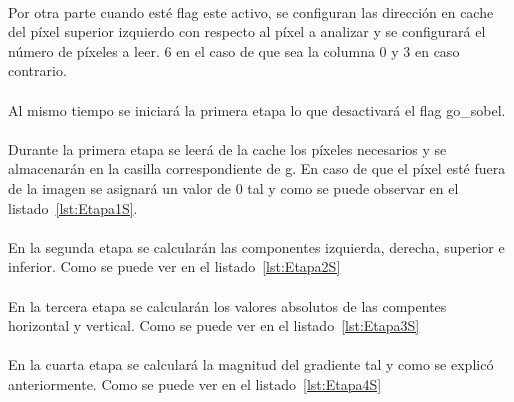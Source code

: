 \documentclass[a4paper,12pt,titlepage,final]{book}
\begin{document}
\paragraph{}
Por otra parte cuando esté flag este activo, se configuran las dirección en cache del píxel superior izquierdo con respecto al píxel a analizar y se configurará el número de píxeles a leer. 6 en el caso de que sea la columna 0 y 3 en caso contrario.

\paragraph{}
Al mismo tiempo se iniciará la primera etapa lo que desactivará el flag go\_sobel.

\paragraph{}
Durante la primera etapa se leerá de la cache los píxeles necesarios y se almacenarán en la casilla correspondiente de g. En caso de que el píxel esté fuera de la imagen se asignará un valor de 0 tal y como se puede observar en el listado~\ref{lst:Etapa1S}.



\paragraph{}
En la segunda etapa se calcularán las componentes izquierda, derecha, superior e inferior. Como se puede ver en el listado~\ref{lst:Etapa2S}



\paragraph{}
En la tercera etapa se calcularán los valores absolutos de las compentes horizontal y vertical. Como se puede ver en el listado~\ref{lst:Etapa3S}



\paragraph{}
En la cuarta etapa se calculará la magnitud del gradiente tal y como se explicó anteriormente. Como se puede ver en el listado~\ref{lst:Etapa4S}
\end{document}
